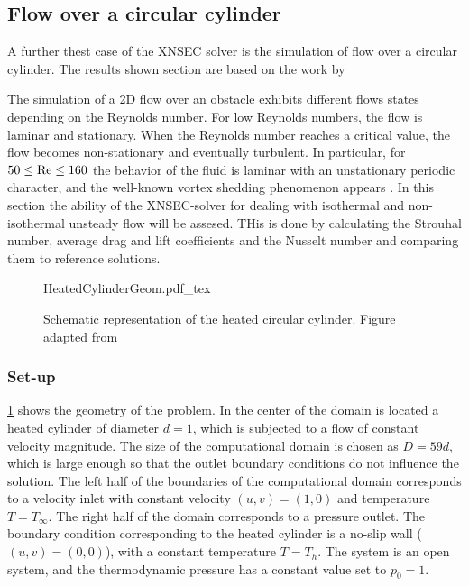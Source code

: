 \subsection{Flow over a circular cylinder}\label{ssec:FlowCircCyl}

A further thest case of the XNSEC solver is the simulation of flow over a circular cylinder. The results shown section are based on the work by \textcite{miaoHighOrderSimulationLowMachFlows2022}

The simulation of a 2D flow over an obstacle exhibits different flows states depending on the Reynolds number. For low Reynolds numbers, the flow is laminar and stationary. When the Reynolds number reaches a critical value, the flow becomes non-stationary and eventually turbulent. In particular, for $50 \leq \text{Re} \leq 160$ the behavior of the fluid is laminar with an unstationary periodic character, and the well-known vortex shedding phenomenon appears \parencite{sharmaHEATFLUIDFLOW2004}. In this section the ability of the XNSEC-solver for dealing with isothermal and non-isothermal unsteady flow will be assesed. 
THis is done by calculating the Strouhal number, average drag and lift coefficients and the Nusselt number and comparing them to reference solutions.
\begin{figure}[t!]
	\begin{center}
		\def\svgwidth{0.88\textwidth}
		{HeatedCylinderGeom.pdf_tex}
		\caption{Schematic representation of the heated circular cylinder. Figure adapted from \parencite{miaoHighOrderSimulationLowMachFlows2022}} 
		\label{fig:CircularCylinderGeom}%
	\end{center}%
\end{figure}%
\subsubsection{Set-up}
\cref{fig:CircularCylinderGeom} shows the geometry of the problem. In the center of the domain is located a heated cylinder of diameter $d = 1$, which is subjected to a flow of constant velocity magnitude. The size of the computational domain is chosen as $D = 59d$, which is large enough so that the outlet boundary conditions do not influence the solution. The left half of the boundaries of the computational domain corresponds to a velocity inlet with constant velocity $(u,v) = (1,0)$ and temperature $T = T_\infty$. The right half of the domain corresponds to a pressure outlet. The boundary condition corresponding to the heated cylinder is a no-slip wall ($(u,v) = (0,0)$), with a constant temperature $T = T_h$. The system is an open system, and the thermodynamic pressure has a constant value set to $p_0 = 1$.

